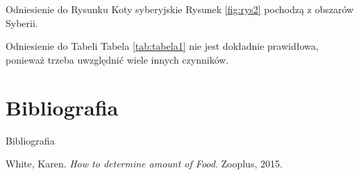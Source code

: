 \documentclass{beamer}
\begin{document}
\begin{frame}{Odniesienie do Rysunku}
  Koty syberyjskie Rysunek \ref{fig:rys2} pochodzą z obszarów Syberii.
\end{frame}

\begin{frame}{Odniesienie do Tabeli}
   Tabela \ref{tab:tabela1} nie jest dokładnie prawidłowa, ponieważ trzeba uwzględnić wiele innych czynników.
\end{frame}

\section{Bibliografia}

\begin{frame}{Bibliografia}
  \begin{thebibliography}{9}
     White, Karen. \emph{How to determine amount of Food}. Zooplus, 2015.
  \end{thebibliography}
\end{frame}
\end{document}
